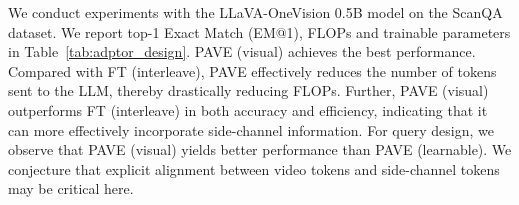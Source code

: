 We conduct experiments with the LLaVA-OneVision 0.5B model on the ScanQA dataset. We report top-1 Exact Match (EM@1), FLOPs and trainable parameters
%
in Table~\ref{tab:adptor_design}. PAVE (visual) achieves the best performance. Compared with FT (interleave), PAVE effectively reduces the number of tokens sent to the LLM, thereby drastically reducing FLOPs. Further, PAVE (visual) outperforms FT (interleave) in both accuracy and efficiency, indicating that it can more effectively incorporate side-channel information.
For query design, we observe that PAVE (visual) yields better performance than PAVE (learnable). We conjecture that explicit alignment between video tokens and side-channel tokens may be critical here. 


